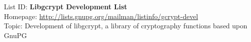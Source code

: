 
List ID: 	\textbf{Libgcrypt Development List}	\\
Homepage: 	\url{http://lists.gnupg.org/mailman/listinfo/gcrypt-devel}	\\	
Topic:		Development of libgcrypt, a library of cryptography functions based upon GnuPG  \\

